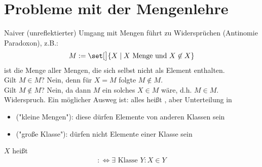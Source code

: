 \section{Probleme mit der Mengenlehre}\label{section:0.3}
Naiver (unreflektierter) Umgang mit Mengen führt zu Widersprüchen (Antinomie Paradoxon), z.B.:
\begin{align*}
	M:=\set[\big]{X\mid X\text{ Menge und }X\not\in X}
\end{align*}
ist die Menge aller Mengen, die sich selbst nicht als Element enthalten.\\
Gilt $M\in M$?
Nein, denn für $X=M$ folgte $M\not\in M$.\\
Gilt $M\not\in M$? Nein, da dann $M$ ein solches $X\in M$ wäre, d.h. $M\in M$.
Widerspruch.\nl
Ein möglicher Ausweg ist: alles heißt , aber Unterteilung in
\begin{itemize}
	\item {} ("kleine Mengen"): diese dürfen Elemente von anderen Klassen sein
	\item {} ("große Klasse"): dürfen nicht Elemente einer Klasse sein
\end{itemize}

\begin{definition} %
	$X$ heißt 
	\begin{align*}
		:\iff\exists\text{ Klasse }Y:X\in Y
	\end{align*}
\end{definition}

